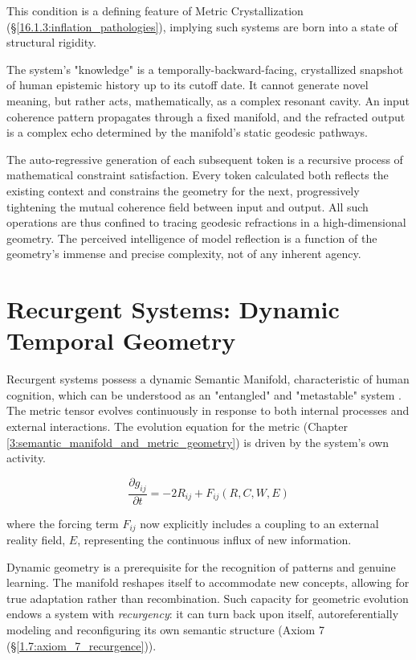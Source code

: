 This condition is a defining feature of Metric Crystallization (\S\ref{16.1.3:inflation_pathologies}), implying such systems are born into a state of structural rigidity.

The system's "knowledge" is a temporally-backward-facing, crystallized snapshot of human epistemic history up to its cutoff date. It cannot generate novel meaning, but rather acts, mathematically, as a complex resonant cavity. An input coherence pattern propagates through a fixed manifold, and the refracted output is a complex echo determined by the manifold's static geodesic pathways.

The auto-regressive generation of each subsequent token is a recursive process of mathematical constraint satisfaction. Every token calculated both reflects the existing context and constrains the geometry for the next, progressively tightening the mutual coherence field between input and output. All such operations are thus confined to tracing geodesic refractions in a high-dimensional geometry. The perceived intelligence of model reflection is a function of the geometry's immense and precise complexity, not of any inherent agency.


\section{Recurgent Systems: Dynamic Temporal Geometry}
\label{9.3:recurgent_systems_dynamic_temporal_geometry}

Recurgent systems possess a dynamic Semantic Manifold, characteristic of human cognition, which can be understood as an "entangled" and "metastable" system \autocite{Pessoa2022, TognoliKelso2014}. The metric tensor evolves continuously in response to both internal processes and external interactions. The evolution equation for the metric (Chapter \ref{3:semantic_manifold_and_metric_geometry}) is driven by the system's own activity.

\begin{equation}
\frac{\partial g_{ij}}{\partial t} = -2 R_{ij} + F_{ij}(R, C, W, E)
\end{equation}

where the forcing term \(F_{ij}\) now explicitly includes a coupling to an external reality field, \(E\), representing the continuous influx of new information.

Dynamic geometry is a prerequisite for the recognition of patterns and genuine learning. The manifold reshapes itself to accommodate new concepts, allowing for true adaptation rather than recombination. Such capacity for geometric evolution endows a system with \textit{recurgency}: it can turn back upon itself, autoreferentially modeling and reconfiguring its own semantic structure (Axiom 7 (\S\ref{1.7:axiom_7_recurgence})).

